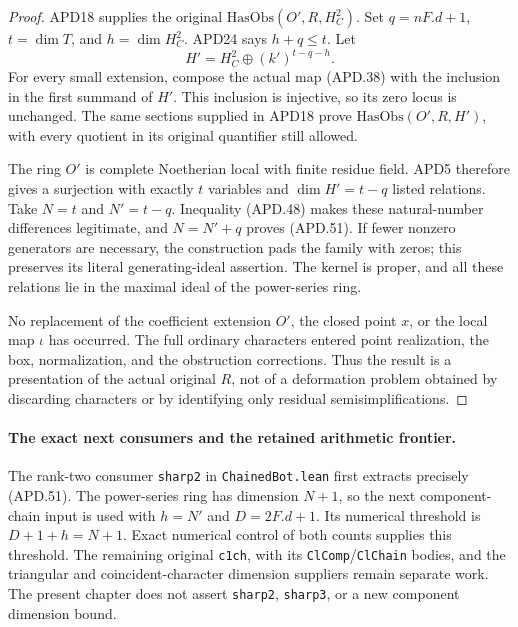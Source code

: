 \documentclass[11pt,a4paper]{article}
\numberwithin{equation}{section}
\theoremstyle{remark}\newtheorem{remark}[theorem]{Remark}
\begin{document}
\begin{proof}
APD18 supplies the original
\(\mathrm{HasObs}(O',R,H_C^2)\).  Set
\(q=nF.d+1\), \(t=\dim T\), and
\(h=\dim H_C^2\).  APD24 says \(h+q\le t\).
Let
\[
              H'=H_C^2\oplus(k')^{t-q-h}.
\]
For every small extension, compose the actual map (APD.38)
with the inclusion in the first summand of \(H'\).  This
inclusion is injective, so its zero locus is unchanged.
The same sections supplied in APD18 prove
\(\mathrm{HasObs}(O',R,H')\), with every quotient in its
original quantifier still allowed.

The ring \(O'\) is complete Noetherian local with finite
residue field.  APD5 therefore gives a surjection with exactly
\(t\) variables and \(\dim H'=t-q\) listed relations.
Take \(N=t\) and \(N'=t-q\).  Inequality (APD.48)
makes these natural-number differences legitimate, and
\(N=N'+q\) proves (APD.51).  If fewer nonzero generators
are necessary, the construction pads the family with zeros;
this preserves its literal generating-ideal assertion.  The
kernel is proper, and all these relations lie in the maximal
ideal of the power-series ring.

No replacement of the coefficient extension \(O'\), the
closed point \(x\), or the local map \(\iota\) has occurred.
The full ordinary characters entered point realization, the
box, normalization, and the obstruction corrections.  Thus
the result is a presentation of the actual original \(R\),
not of a deformation problem obtained by discarding characters
or by identifying only residual semisimplifications.
\end{proof}

\paragraph{The exact next consumers and the retained arithmetic frontier.}
The rank-two consumer \texttt{sharp2} in
\texttt{Chained\allowbreak Bot.\allowbreak lean} first extracts precisely (APD.51).
The power-series ring has dimension \(N+1\), so the next
component-chain input is used with \(h=N'\) and
\(D=2F.d+1\).  Its numerical threshold is
\(D+1+h=N+1\).  Exact numerical control of both counts
supplies this threshold.  The remaining original
\texttt{c1ch}, with its \texttt{Cl\allowbreak Comp}/\texttt{Cl\allowbreak Chain}
bodies, and the triangular and coincident-character dimension
suppliers remain separate work.  The present chapter does not
assert \texttt{sharp2}, \texttt{sharp3}, or a new component
dimension bound.
\end{document}
